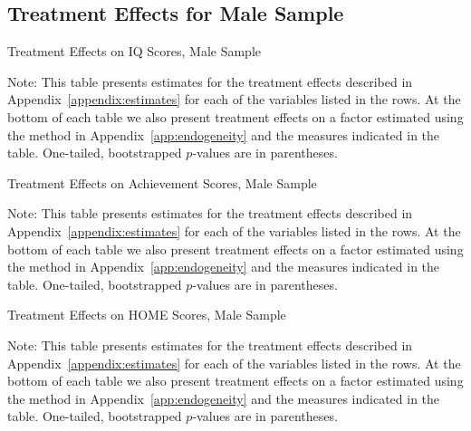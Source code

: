 \subsection{Treatment Effects for Male Sample}


	\begin{table}[H]
     \caption{Treatment Effects on IQ Scores, Male Sample}
     \label{table:abccare_rslt_male_cat0}
	
	\end{table} 
\begin{spacing}{1}
\begin{footnotesize}
\noindent Note: This table presents estimates for the treatment effects described in Appendix~\ref{appendix:estimates} for each of the variables listed in the rows. At the bottom of each table we also present treatment effects on a factor estimated using the method in Appendix~\ref{app:endogeneity} and the measures indicated in the table. One-tailed, bootstrapped $p$-values are in parentheses.
\end{footnotesize}
\end{spacing}

	\begin{table}[H]
     \caption{Treatment Effects on Achievement Scores, Male Sample}
     \label{table:abccare_rslt_male_cat1}
	
	\end{table} 
\begin{spacing}{1}
\begin{footnotesize}
\noindent Note: This table presents estimates for the treatment effects described in Appendix~\ref{appendix:estimates} for each of the variables listed in the rows. At the bottom of each table we also present treatment effects on a factor estimated using the method in Appendix~\ref{app:endogeneity} and the measures indicated in the table. One-tailed, bootstrapped $p$-values are in parentheses.
\end{footnotesize}
\end{spacing}

	\begin{table}[H]
     \caption{Treatment Effects on HOME Scores, Male Sample}
     \label{table:abccare_rslt_male_cat2}
	
	\end{table} 
\begin{spacing}{1}
\begin{footnotesize}
\noindent Note: This table presents estimates for the treatment effects described in Appendix~\ref{appendix:estimates} for each of the variables listed in the rows. At the bottom of each table we also present treatment effects on a factor estimated using the method in Appendix~\ref{app:endogeneity} and the measures indicated in the table. One-tailed, bootstrapped $p$-values are in parentheses.
\end{footnotesize}
\end{spacing}

